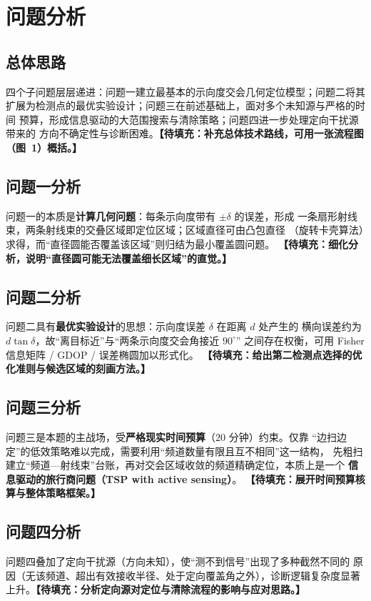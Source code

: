 \section{问题分析}

\subsection{总体思路}
四个子问题层层递进：问题一建立最基本的示向度交会几何定位模型；问题二将其
扩展为检测点的最优实验设计；问题三在前述基础上，面对多个未知源与严格的时间
预算，形成信息驱动的大范围搜索与清除策略；问题四进一步处理定向干扰源带来的
方向不确定性与诊断困难。\textbf{【待填充：补充总体技术路线，可用一张流程图
（图~1）概括。】}

\subsection{问题一分析}
问题一的本质是\textbf{计算几何问题}：每条示向度带有 $\pm \delta$ 的误差，形成
一条扇形射线束，两条射线束的交叠区域即定位区域；区域直径可由凸包直径
（旋转卡壳算法）求得，而“直径圆能否覆盖该区域”则归结为最小覆盖圆问题。
\textbf{【待填充：细化分析，说明“直径圆可能无法覆盖细长区域”的直觉。】}

\subsection{问题二分析}
问题二具有\textbf{最优实验设计}的思想：示向度误差 $\delta$ 在距离 $d$ 处产生的
横向误差约为 $d\tan\delta$，故“离目标近”与“两条示向度交会角接近 $90^\circ$”
之间存在权衡，可用 Fisher 信息矩阵 / GDOP / 误差椭圆加以形式化。
\textbf{【待填充：给出第二检测点选择的优化准则与候选区域的刻画方法。】}

\subsection{问题三分析}
问题三是本题的主战场，受\textbf{严格现实时间预算}（$20$ 分钟）约束。仅靠
“边扫边定”的低效策略难以完成，需要利用“频道数量有限且互不相同”这一结构，
先粗扫建立“频道—射线束”台账，再对交会区域收敛的频道精确定位，本质上是一个
\textbf{信息驱动的旅行商问题（TSP with active sensing）}。
\textbf{【待填充：展开时间预算核算与整体策略框架。】}

\subsection{问题四分析}
问题四叠加了定向干扰源（方向未知），使“测不到信号”出现了多种截然不同的
原因（无该频道、超出有效接收半径、处于定向覆盖角之外），诊断逻辑复杂度显著
上升。\textbf{【待填充：分析定向源对定位与清除流程的影响与应对思路。】}
